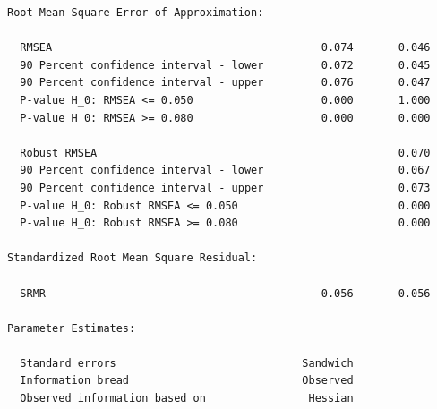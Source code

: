 \documentclass[
  12pt,
  a4paper,
  DIV=11,
  numbers=noendperiod]{scrartcl}
\begin{document}
\begin{verbatim}
Root Mean Square Error of Approximation:

  RMSEA                                          0.074       0.046
  90 Percent confidence interval - lower         0.072       0.045
  90 Percent confidence interval - upper         0.076       0.047
  P-value H_0: RMSEA <= 0.050                    0.000       1.000
  P-value H_0: RMSEA >= 0.080                    0.000       0.000
                                                                  
  Robust RMSEA                                               0.070
  90 Percent confidence interval - lower                     0.067
  90 Percent confidence interval - upper                     0.073
  P-value H_0: Robust RMSEA <= 0.050                         0.000
  P-value H_0: Robust RMSEA >= 0.080                         0.000

Standardized Root Mean Square Residual:

  SRMR                                           0.056       0.056

Parameter Estimates:

  Standard errors                             Sandwich
  Information bread                           Observed
  Observed information based on                Hessian


\end{verbatim}
\end{document}
